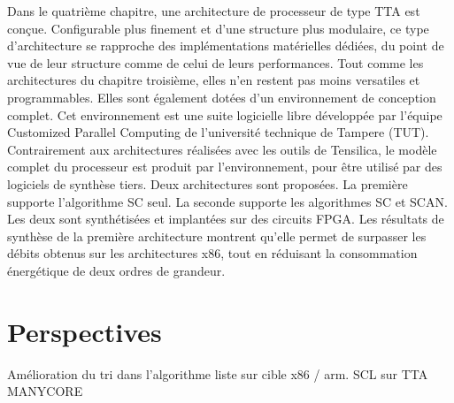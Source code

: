 Dans le quatrième chapitre, une architecture de processeur de type TTA est conçue. Configurable plus finement et d'une structure plus modulaire, ce type d'architecture se rapproche des implémentations matérielles dédiées, du point de vue de leur structure comme de celui de leurs performances. Tout comme les architectures du chapitre troisième, elles n'en restent pas moins versatiles et programmables. Elles sont également dotées d'un environnement de conception complet. Cet environnement est une suite logicielle libre développée par l'équipe \og Customized Parallel Computing \fg de l'université technique de Tampere (TUT). Contrairement aux architectures réalisées avec les outils de Tensilica, le modèle complet du processeur est produit par l'environnement, pour être utilisé par des logiciels de synthèse tiers. Deux architectures sont proposées. La première supporte l'algorithme SC seul. La seconde supporte les algorithmes SC et SCAN. Les deux sont synthétisées et implantées sur des circuits FPGA. Les résultats de synthèse de la première architecture montrent qu'elle permet de surpasser les débits obtenus sur les architectures x86, tout en réduisant la consommation énergétique de deux ordres de grandeur.

\section*{Perspectives}

Amélioration du tri dans l'algorithme liste sur cible x86 / arm.
SCL sur TTA
MANYCORE
